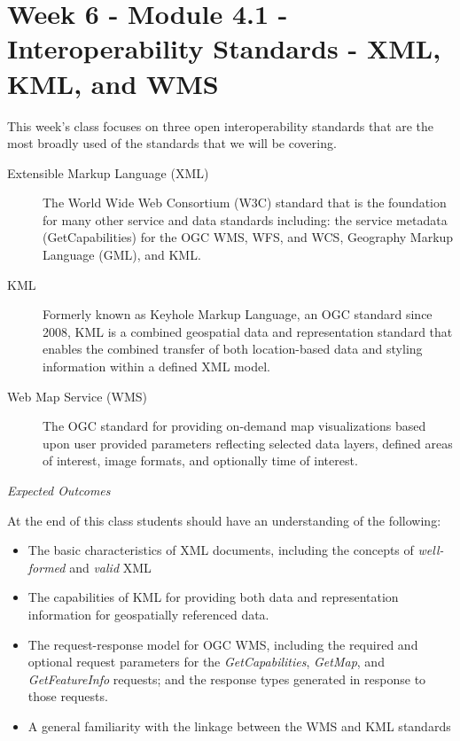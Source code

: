 \documentclass[]{book}
\begin{document}
\chapter{Week 6 - Module 4.1 - Interoperability Standards - XML, KML,
and WMS}\label{week06}

This week's class focuses on three open interoperability standards that
are the most broadly used of the standards that we will be covering.

\begin{description}
\item[Extensible Markup Language (XML)]
The World Wide Web Consortium (W3C) standard that is the foundation for
many other service and data standards including: the service metadata
(GetCapabilities) for the OGC WMS, WFS, and WCS, Geography Markup
Language (GML), and KML.
\item[KML]
Formerly known as Keyhole Markup Language, an OGC standard since 2008,
KML is a combined geospatial data and representation standard that
enables the combined transfer of both location-based data and styling
information within a defined XML model.
\item[Web Map Service (WMS)]
The OGC standard for providing on-demand map visualizations based upon
user provided parameters reflecting selected data layers, defined areas
of interest, image formats, and optionally time of interest.
\end{description}

\emph{Expected Outcomes}

At the end of this class students should have an understanding of the
following:

\begin{itemize}
\item
  The basic characteristics of XML documents, including the concepts of
  \emph{well-formed} and \emph{valid} XML
\item
  The capabilities of KML for providing both data and representation
  information for geospatially referenced data.
\item
  The request-response model for OGC WMS, including the required and
  optional request parameters for the \emph{GetCapabilities},
  \emph{GetMap}, and \emph{GetFeatureInfo} requests; and the response
  types generated in response to those requests.
\item
  A general familiarity with the linkage between the WMS and KML
  standards
\end{itemize}
\end{document}
